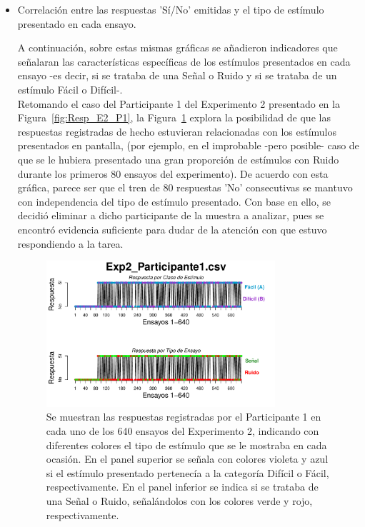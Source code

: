 \begin{itemize}

\item Correlación entre las respuestas 'Sí/No' emitidas y el tipo de estímulo presentado en cada ensayo.

A continuación, sobre estas mismas gráficas se añadieron indicadores que señalaran las características específicas de los estímulos presentados en cada ensayo -es decir, si se trataba de una Señal o Ruido y si se trataba de un estímulo Fácil o Difícil-.\\ 

Retomando el caso del Participante 1 del Experimento 2 presentado en la Figura~\ref{fig:Resp_E2_P1}, la Figura~\ref{fig:BiasResp_E1_P1} explora la posibilidad de que las respuestas registradas de hecho estuvieran relacionadas con los estímulos presentados en pantalla, (por ejemplo, en el improbable -pero posible- caso de que se le hubiera presentado una gran proporción de estímulos con Ruido durante los primeros 80 ensayos del experimento). De acuerdo con esta gráfica, parece ser que el tren de 80 respuestas 'No' consecutivas se mantuvo con independencia del tipo de estímulo presentado. Con base en ello, se decidió eliminar a dicho participante de la muestra a analizar, pues se encontró evidencia suficiente para dudar de la atención con que estuvo respondiendo a la tarea.\\

\begin{figure}[th]
\centering
\includegraphics[width=0.80\textwidth]{Figures/BiasResp_Exp2_P1} 
\caption[Respuesta por Tipo de Estímulo; ejemplo de participante sesgado]{Se muestran las respuestas registradas por el Participante 1 en cada uno de los 640 ensayos del Experimento 2, indicando con diferentes colores el tipo de estímulo que se le mostraba en cada ocasión. En el panel superior se señala con colores violeta y azul si el estímulo presentado pertenecía a la categoría Difícil o Fácil, respectivamente. En el panel inferior se indica si se trataba de una Señal o Ruido, señalándolos con los colores verde y rojo, respectivamente.}
\label{fig:BiasResp_E1_P1}
\end{figure}


\end{itemize}

